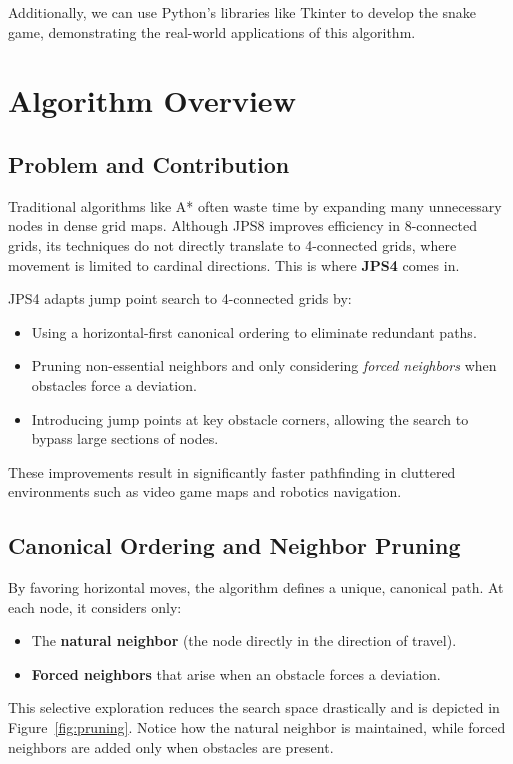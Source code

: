\documentclass[11pt]{article}
\begin{document}
Additionally, we can use Python's libraries like Tkinter to develop the snake game, demonstrating the real-world applications of this algorithm.

\section{Algorithm Overview}


\subsection*{Problem and Contribution}
Traditional algorithms like A* often waste time by expanding many unnecessary nodes in dense grid maps. Although JPS8 improves efficiency in 8-connected grids, its techniques do not directly translate to 4-connected grids, where movement is limited to cardinal directions. This is where \textbf{JPS4} comes in.

JPS4 adapts jump point search to 4-connected grids by:
\begin{itemize}
    \item Using a horizontal-first canonical ordering to eliminate redundant paths.
    \item Pruning non-essential neighbors and only considering \emph{forced neighbors} when obstacles force a deviation.
    \item Introducing jump points at key obstacle corners, allowing the search to bypass large sections of nodes.
\end{itemize}
These improvements result in significantly faster pathfinding in cluttered environments such as video game maps and robotics navigation.



\subsection*{Canonical Ordering and Neighbor Pruning}
By favoring horizontal moves, the algorithm defines a unique, canonical path. At each node, it considers only:
\begin{itemize}
    \item The \textbf{natural neighbor} (the node directly in the direction of travel).
    \item \textbf{Forced neighbors} that arise when an obstacle forces a deviation.
\end{itemize}
This selective exploration reduces the search space drastically and is depicted in Figure~\ref{fig:pruning}. Notice how the natural neighbor is maintained, while forced neighbors are added only when obstacles are present.
\end{document}
